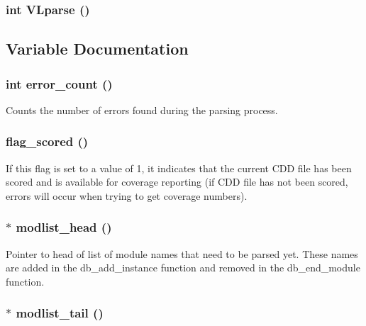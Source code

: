 \subsubsection{\setlength{\rightskip}{0pt plus 5cm}int VLparse ()}\label{parse_8c_a7}




\subsection{Variable Documentation}
\subsubsection{\setlength{\rightskip}{0pt plus 5cm}int {\bf error\_\-count} ()}\label{parse_8c_a4}


Counts the number of errors found during the parsing process. 
\subsubsection{ {\bf flag\_\-scored} ()}\label{parse_8c_a5}


If this flag is set to a value of 1, it indicates that the current CDD file has been scored and is available for coverage reporting (if CDD file has not been scored, errors will occur when trying to get coverage numbers). 
\subsubsection{$\ast$ {\bf modlist\_\-head} ()}\label{parse_8c_a1}


Pointer to head of list of module names that need to be parsed yet. These names are added in the db\_\-add\_\-instance function and removed in the db\_\-end\_\-module function. 
\subsubsection{$\ast$ {\bf modlist\_\-tail} ()}\label{parse_8c_a2}


